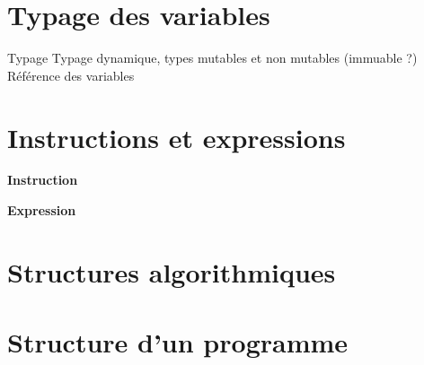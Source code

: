 \documentclass[10pt]{article}
\begin{document}


\section{Typage des variables}
\begin{defi}
Typage
Typage dynamique, types mutables et non mutables (immuable ?)
Référence des variables
\end{defi}

\begin{exemple}
\end{exemple}

\section{Instructions et expressions}

\begin{defi}
\textbf{Instruction}

\textbf{Expression}
\end{defi}

\begin{exemple}

\end{exemple}

\section{Structures algorithmiques}


\section{Structure d'un programme}

 \renewcommand{\baselinestretch}{1.2}
\setlength{\parskip}{2ex plus 0.5ex minus 0.2ex}
\end{document}
